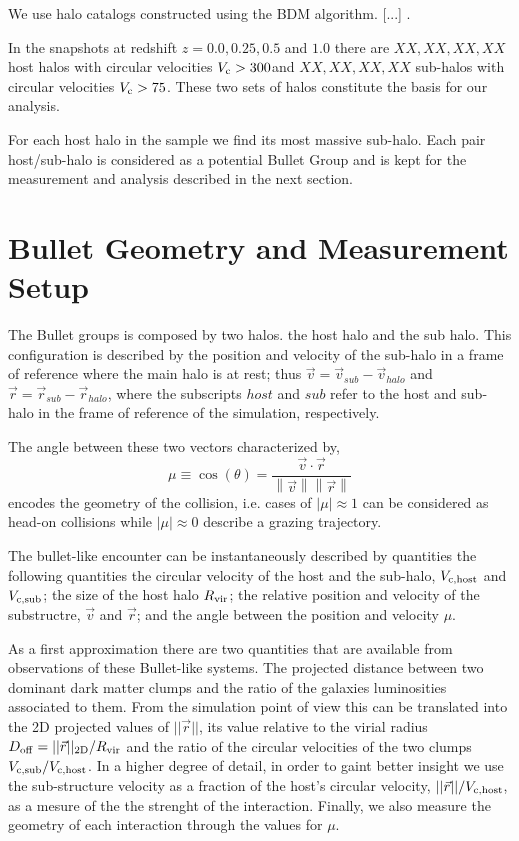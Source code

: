 \documentclass{emulateapj}
\newcommand{\kms}{{\ifmmode{{\mathrm{\,km\ s}^{-1}}}\else{\,km~s$^{-1}$}\fi}}
\begin{document}
We use halo catalogs constructed using the BDM algorithm. [...] \citep{Riebe2013}.


In the snapshots at redshift $z=0.0,0.25, 0.5$ and $1.0$ there are
$XX, XX, XX, XX$ host halos with circular velocities $V_{\rm c}>
300$\kms and $XX, XX, XX, XX$ sub-halos with circular velocities
$V_{\rm c}>75$\kms. These two sets of halos constitute the basis for
our analysis.

For each host halo in the sample we find its most massive
sub-halo. Each pair host/sub-halo is considered as a potential Bullet
Group and is kept for the measurement and analysis described in the
next section.

\section{Bullet Geometry and Measurement Setup}
\label{sec:setup}

The Bullet groups is composed by two halos. the host halo and the sub
halo. This configuration is described by the position and velocity of
the sub-halo in a frame of reference where the main halo is at rest;
thus  $\vec{v{}}=\vec{v}_{sub}-\vec{v}_{halo}$ and 
$\vec{r}=\vec{r}_{sub}-\vec{r}_{halo}$, where the subscripts $host$
and $sub$ refer to the host and sub-halo in the frame of reference of
the simulation, respectively.

The angle between these two vectors characterized by, 
\begin{equation}
  \mu\equiv
  \cos(\theta)=\frac{\vec{v{}}\cdotp{}\vec{r}}{\left\|\vec{v}{}\right\|
    \left\|\vec{r}\right\|} 
 \end{equation} 
%
encodes the geometry of the collision, i.e. cases of $|\mu|\approx 1$
can be considered as head-on collisions while $|\mu|\approx 0$
describe a grazing trajectory.

The bullet-like encounter can be instantaneously described by
quantities the following quantities the circular velocity of the host
and the sub-halo, $V_{\rm c,host}$ and $V_{\rm c,  sub}$; the size of
the host halo $R_{\rm vir}$; the relative position and velocity of the
substructre, $\vec{v}$ and $\vec{r}$; and the angle between the
position and velocity $\mu$. 

As a first approximation there are two quantities that are available
from observations of these Bullet-like systems. The projected distance
between two dominant dark matter clumps and the ratio of the
galaxies luminosities associated to them. From the simulation point
of view this can be translated into the 2D projected values of
$||\vec{r}||$, its value relative to the virial radius $D_{\rm off}=
||\vec{r}||_{\rm 2D}/R_{\rm vir}$ and the ratio of the circular velocities
of the two clumps $V_{\rm c,sub}/V_{\rm c,host}$. In a higher degree
of detail, in order to gaint better insight we use
the sub-structure velocity as a fraction of the host's circular
velocity, $||\vec{r}||/V_{\rm c, host}$, as a mesure of the the strenght
of the interaction.  Finally, we also measure the geometry of each
interaction through the values for $\mu$.
\end{document}
